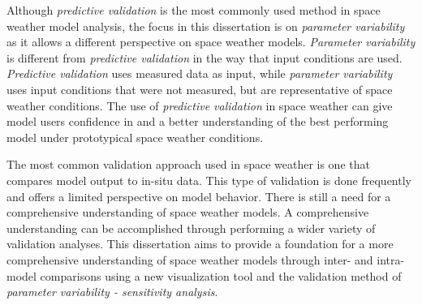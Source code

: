 Although \textit{predictive validation} is the most commonly used method in
space weather model analysis, the focus in this dissertation is on
\textit{parameter variability} as it allows a different perspective on
space weather models. \textit{Parameter variability} is different from
\textit{predictive validation} in the way that input conditions are used.
\textit{Predictive validation} uses measured data as input, while
\textit{parameter variability} uses input conditions that were not measured, but
are representative of space weather conditions. The
use of \textit{predictive validation} in space weather can give model users
confidence in and a better understanding of the best performing model under
prototypical space weather conditions.

The most common validation approach used in space weather is
one that compares model output to in-situ data. This type of validation is done
frequently and offers a limited perspective on model behavior.
There is still a need for a comprehensive understanding of space weather models. A
comprehensive understanding can be accomplished through performing a wider
variety of validation analyses. This dissertation aims to provide
a foundation for a more comprehensive understanding of space weather models
through inter- and intra-model comparisons using a new visualization tool and the validation method of \textit{parameter variability - sensitivity
analysis}.
